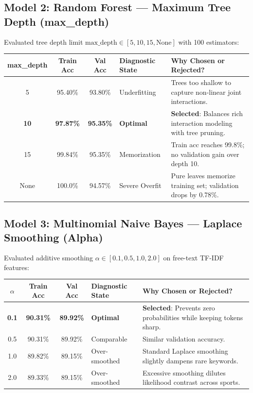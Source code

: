 \documentclass[11pt,a4paper]{article}
\begin{document}
\subsection{Model 2: Random Forest --- Maximum Tree Depth (max\_depth)}
Evaluated tree depth limit $\text{max\_depth} \in [5, 10, 15, \text{None}]$ with 100 estimators:
\begin{center}
\small
\begin{tabularx}{\textwidth}{ccclX}
\toprule
\textbf{max\_depth} & \textbf{Train Acc} & \textbf{Val Acc} & \textbf{Diagnostic State} & \textbf{Why Chosen or Rejected?} \\
\midrule
5 & 95.40\% & 93.80\% & Underfitting & Trees too shallow to capture non-linear joint interactions. \\
\textbf{10} & \textbf{97.87\%} & \textbf{95.35\%} & \textbf{Optimal} & \textbf{Selected}: Balances rich interaction modeling with tree pruning. \\
15 & 99.84\% & 95.35\% & Memorization & Train acc reaches 99.8\%; no validation gain over depth 10. \\
None & 100.0\% & 94.57\% & Severe Overfit & Pure leaves memorize training set; validation drops by 0.78\%. \\
\bottomrule
\end{tabularx}
\end{center}

\subsection{Model 3: Multinomial Naive Bayes --- Laplace Smoothing (Alpha)}
Evaluated additive smoothing $\alpha \in [0.1, 0.5, 1.0, 2.0]$ on free-text TF-IDF features:
\begin{center}
\small
\begin{tabularx}{\textwidth}{ccclX}
\toprule
$\alpha$ & \textbf{Train Acc} & \textbf{Val Acc} & \textbf{Diagnostic State} & \textbf{Why Chosen or Rejected?} \\
\midrule
\textbf{0.1} & \textbf{90.31\%} & \textbf{89.92\%} & \textbf{Optimal} & \textbf{Selected}: Prevents zero probabilities while keeping tokens sharp. \\
0.5 & 90.31\% & 89.92\% & Comparable & Similar validation accuracy. \\
1.0 & 89.82\% & 89.15\% & Over-smoothed & Standard Laplace smoothing slightly dampens rare keywords. \\
2.0 & 89.33\% & 89.15\% & Over-smoothed & Excessive smoothing dilutes likelihood contrast across sports. \\
\bottomrule
\end{tabularx}
\end{center}
\end{document}
